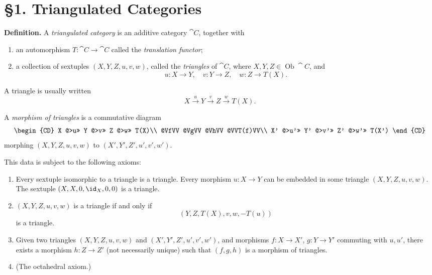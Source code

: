 \setcounter{page}{20}
\section{\S1. Triangulated Categories}

\textbf{Definition.}
A \textit{triangulated category} is an additive category \(\cat{C}\), together with
\begin{enumerate}
\item[(a)] an automorphism \(T\colon \cat{C}\to\cat{C}\) called the \textit{translation functor};
\item[(b)] a collection of sextuples \((X,Y,Z,u,v,w)\), called the \textit{triangles} of \(\cat{C}\), where \(X,Y,Z\in\operatorname{Ob}\cat{C}\), and
\[
u\colon X\to Y,\quad v\colon Y\to Z,\quad w\colon Z\to T(X).
\]
\end{enumerate}
A triangle is usually written
\[
X\xrightarrow{u} Y\xrightarrow{v} Z\xrightarrow{w} T(X).
\]

A \textit{morphism of triangles} is a commutative diagram
\[
\begin{CD}
X @>u>> Y @>v>> Z @>w>> T(X)\\
@VfVV @VgVV @VhVV @VVT(f)VV\\
X' @>u'>> Y' @>v'>> Z' @>w'>> T(X')
\end{CD}
\]
morphing \((X,Y,Z,u,v,w)\) to \((X',Y',Z',u',v',w')\).

This data is subject to the following axioms:

\setcounter{page}{21}

\begin{enumerate}
\item[(TR1)] Every sextuple isomorphic to a triangle is a triangle.
Every morphism \(u\colon X\to Y\) can be embedded in some triangle \((X,Y,Z,u,v,w)\).
The sextuple \((X,X,0,\id_X,0,0)\) is a triangle.

\item[(TR2)] \((X,Y,Z,u,v,w)\) is a triangle if and only if
\[
(Y,Z,T(X),v,w,-T(u))
\]
is a triangle.

\item[(TR3)] Given two triangles \((X,Y,Z,u,v,w)\) and \((X',Y',Z',u',v',w')\), and morphisms \(f\colon X\to X'\), \(g\colon Y\to Y'\) commuting with \(u,u'\), there exists a morphism \(h\colon Z\to Z'\) (not necessarily unique) such that \((f,g,h)\) is a morphism of triangles.

\item[(TR4)] (The octahedral axiom.)
\end{enumerate}

